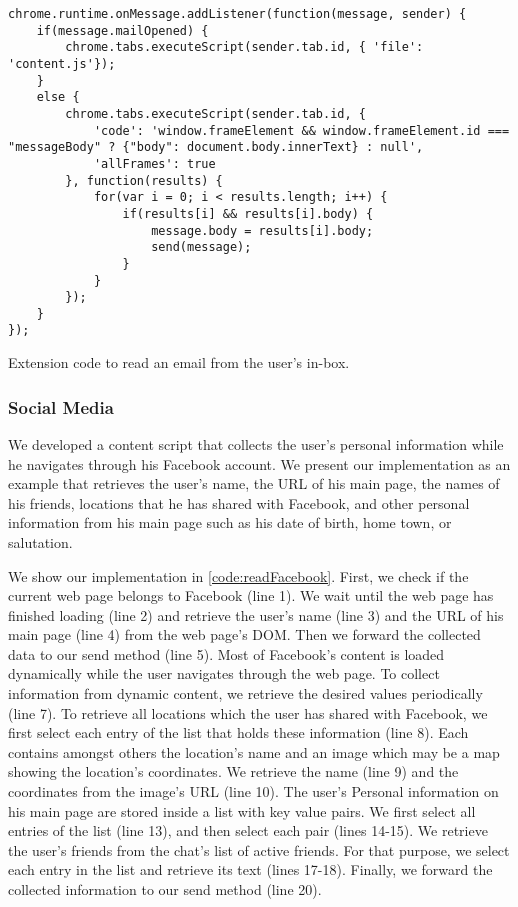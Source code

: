 	\begin{code}
		\begin{lstlisting}
chrome.runtime.onMessage.addListener(function(message, sender) {
	if(message.mailOpened) {
		chrome.tabs.executeScript(sender.tab.id, { 'file': 'content.js'});
	}
	else {
		chrome.tabs.executeScript(sender.tab.id, {
			'code': 'window.frameElement && window.frameElement.id === "messageBody" ? {"body": document.body.innerText} : null',
			'allFrames': true
		}, function(results) {
			for(var i = 0; i < results.length; i++) {
				if(results[i] && results[i].body) {
					message.body = results[i].body;
					send(message);
				}
			}
		});
	}
});
\end{lstlisting}
		\caption{Extension code to read an email from the user's in-box.}
		\label{code:readIncomingEmailBackground}
	\end{code}
	

\subsubsection{Social Media}

	We developed a content script that collects the user's personal information while he navigates through his Facebook account. We present our implementation as an example that retrieves the user's name, the URL of his main page, the names of his friends, locations that he has shared with Facebook, and other personal information from his main page such as his date of birth, home town, or salutation.
	
	We show our implementation in \autoref{code:readFacebook}. First, we check if the current web page belongs to Facebook (line 1). We wait until the web page has finished loading (line 2) and retrieve the user's name (line 3) and the URL of his main page (line 4) from the web page's DOM. Then we forward the collected data to our send method (line 5). Most of Facebook's content is loaded dynamically while the user navigates through the web page. To collect information from dynamic content, we retrieve the desired values periodically (line 7). To retrieve all locations which the user has shared with Facebook, we first select each entry of the list that holds these information (line 8). Each contains amongst others the location's name and an image which may be a map showing the location's coordinates. We retrieve the name (line 9) and the coordinates from the image's URL (line 10). The user's Personal information on his main page are stored inside a list with key value pairs. We first select all entries of the list (line 13), and then select each pair (lines 14-15). We retrieve the user's friends from the chat's list of active friends. For that purpose, we select each entry in the list and retrieve its text (lines 17-18). Finally, we forward the collected information to our send method (line 20).

